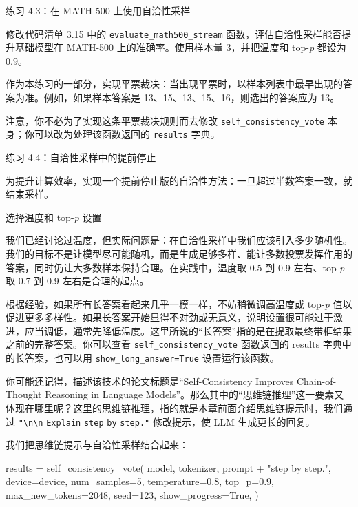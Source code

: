 \begin{mySidebar}{练习 4.3：在 MATH-500 上使用自洽性采样}

修改代码清单 3.15 中的 \texttt{evaluate\_math500\_stream} 函数，评估自洽性采样能否提升基础模型在 MATH-500 上的准确率。使用样本量 3，并把温度和 top-\emph{p} 都设为 0.9。

作为本练习的一部分，实现平票裁决：当出现平票时，以样本列表中最早出现的答案为准。例如，如果样本答案是 13、15、13、15、16，则选出的答案应为 13。

注意，你不必为了实现这条平票裁决规则而去修改 \texttt{self\_consistency\_vote} 本身；你可以改为处理该函数返回的 \texttt{results} 字典。

\end{mySidebar}

\begin{mySidebar}{练习 4.4：自洽性采样中的提前停止}

为提升计算效率，实现一个提前停止版的自洽性方法：一旦超过半数答案一致，就结束采样。

\end{mySidebar}

\begin{mySidebar}{选择温度和 top-\emph{p} 设置}

我们已经讨论过温度，但实际问题是：在自洽性采样中我们应该引入多少随机性。我们的目标不是让模型尽可能随机，而是生成足够多样、能让多数投票发挥作用的答案，同时仍让大多数样本保持合理。在实践中，温度取 0.5 到 0.9 左右、top-\emph{p} 取 0.7 到 0.9 左右是合理的起点。

根据经验，如果所有长答案看起来几乎一模一样，不妨稍微调高温度或 top-\emph{p} 值以促进更多多样性。如果长答案开始显得不对劲或无意义，说明设置很可能过于激进，应当调低，通常先降低温度。这里所说的“长答案”指的是在提取最终带框结果之前的完整答案。你可以查看 \texttt{self\_consistency\_vote} 函数返回的 results 字典中的长答案，也可以用 \texttt{show\_long\_answer=True} 设置运行该函数。

\end{mySidebar}

你可能还记得，描述该技术的论文标题是“Self-Consistency Improves Chain-of-Thought Reasoning in Language Models”。那么其中的“思维链推理”这一要素又体现在哪里呢？这里的思维链推理，指的就是本章前面介绍思维链提示时，我们通过 \texttt{"}\texttt{\textbackslash n\textbackslash n} \texttt{Explain} \texttt{step} \texttt{by} \texttt{step.}\texttt{"} 修改提示，使 LLM 生成更长的回复。

我们把思维链提示与自洽性采样结合起来：

\begin{codebox}
results = self_consistency_vote(
    model,
    tokenizer,
    prompt + "\n\nExplain step by step.",
    device=device,
    num_samples=5,
    temperature=0.8,
    top_p=0.9,
    max_new_tokens=2048,
    seed=123,
    show_progress=True,
)
\end{codebox}

